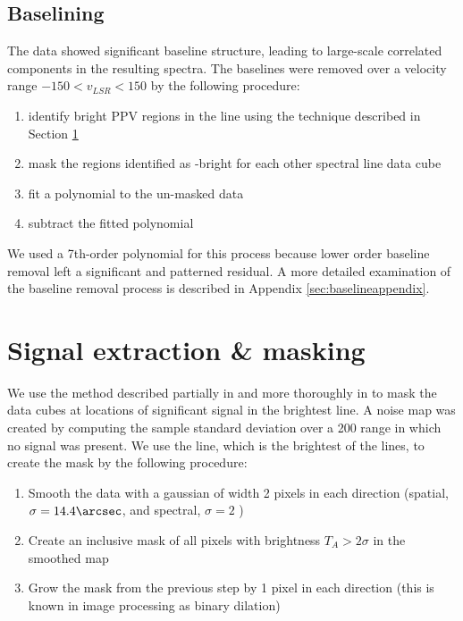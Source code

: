 

\subsection{Baselining}
\label{sec:baseline}
The data showed significant baseline structure, leading to large-scale
correlated components in the resulting spectra.  The baselines were removed
over a velocity range $-150 < v_{LSR} < 150$ \kms by the
following procedure:
\begin{enumerate}
    \item identify bright PPV regions in the \para \threeohthree line using the
        technique described in Section \ref{sec:signal}
    \item mask the regions identified as \threeohthree-bright for each other 
        spectral line data cube
    \item fit a polynomial to the un-masked data
    \item subtract the fitted polynomial
\end{enumerate}
We used a 7th-order polynomial for this process because lower order baseline
removal left a significant and patterned residual.  A more detailed examination
of the baseline removal process is described in Appendix
\ref{sec:baselineappendix}.

\section{Signal extraction \& masking}
\label{sec:signal}
We use the method described partially in \citet{Ao2013a} and more thoroughly in
\citet{Dame2011b} to mask the data cubes at locations of significant signal in 
the brightest line. 
A noise map was created by computing the sample standard deviation over a
200 \kms range in which no signal was present.
We use the \para \threeohthree line, which is the brightest of the
\formaldehyde lines, to create the mask by
the following procedure:

\begin{enumerate}
    \item Smooth the data with a gaussian of width 2 pixels in each direction
        (spatial, $\sigma=14.4\arcsec$, and spectral, $\sigma=2$ \kms)
    \item Create an inclusive mask of all pixels with brightness $T_A >
        2\sigma$ in the smoothed map
    \item Grow the mask from the previous step by 1 pixel in each direction
        (this is known in image processing as binary dilation)
\end{enumerate}

